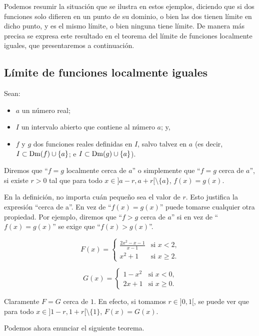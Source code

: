 Podemos resumir la situación que se ilustra en estos ejemplos, diciendo que si dos funciones
solo difieren en un punto de su dominio, o bien las dos tienen límite en dicho punto, y es el mismo
límite, o bien ninguna tiene límite. De manera más precisa se expresa este resultado en el teorema del límite de funciones localmente iguales, que presentaremos a continuación.

\subsection{Límite de funciones localmente iguales}

\begin{defical}
Sean: 
\begin{itemize}
      \item[] $a$ un número real;
      \item[] $I$ un intervalo abierto que contiene al número $a$; y,
      \item[] $f$ y $g$ dos funciones reales definidas en $I$, salvo talvez en $a$ (es decir, $I\subset \operatorname{Dm}(f)\cup \{a\}$; e $I\subset \operatorname{Dm}(g)\cup \{a\}$).
\end{itemize}
Diremos que ``$f=g$ localmente cerca de $a$'' o simplemente que ``$f=g$ cerca de $a$'', si existe $r>0$ tal que para todo $x\in ]a-r, a+r[ \setminus \{a\}$, $f(x)=g(x)$.
\end{defical}

En la definición, no importa cuán pequeño sea el valor de $r$. Esto justifica la expresión ``cerca de a''. En vez de ``$f(x)=g(x)$'' puede tomarse cualquier otra propiedad. Por ejemplo, diremos que ``$f > g$ cerca de $a$'' si en vez de ``$f(x)=g(x)$'' se exige que ``$f(x) > g(x)$''.

\begin{exemplo}[ ]{%
\[
	F(x)=
\begin{cases}
\displaystyle\frac{2x^2-x-1}{x-1} & \text{si $x<2$,} \\
x^2+1 & \text{si $x\geq 2$}.
\end{cases}
\]

\[
	G(x)=
\begin{cases}
1-x^2 & \text{si $x<0$,} \\
2x+1 & \text{si $x\geq 0$}.
\end{cases}
\]
}%
Claramente $F=G$ cerca de $1$. En efecto, si tomamos $r\in ]0,1[$, se puede ver que para todo $x\in ]1-r, 1+r[\setminus \{1\}$, $F(x)=G(x)$.

Podemos ahora enunciar el siguiente teorema.
\end{exemplo}


